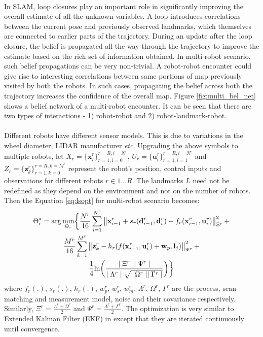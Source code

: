 \paragraph{}
In SLAM, loop closures play an important role in significantly improving the overall estimate of all the unknown variables. A loop introduces correlations between the current pose and previously observed landmarks, which themselves are connected to earlier parts of the trajectory. During an update after the loop closure, the belief is propagated all the way through the trajectory to improve the estimate based on the rich set of information obtained. In multi-robot scenario, such belief propagations can be very non-trivial. A robot-robot encounter could give rise to interesting correlations between same portions of map previously visited by both the robots. In such cases, propagating the belief across both the trajectory increases the confidence of the overall map. Figure \ref{fig:multi_bel_net} shows a belief network of a multi-robot encounter. It can be seen that there are two types of interactions - 1) robot-robot and 2) robot-landmark-robot. 
\paragraph{}
Different robots have different sensor models. This is due to variations in the wheel diameter, LIDAR manufacturer \textit{etc}. Upgrading the above symbols to multiple robots, let $X_r = \{\textbf{x}_i^r\}_{r=1,i=0}^{r=R,i=N^r}$, $U_r = \{\textbf{u}_i^r\}_{r=1,i=1}^{r=R,i=N^r}$ and $Z_r = \{\textbf{z}_k^r\}_{r=1,k=0}^{r=R,k=M^r}$ represent the robot's position, control inputs and observations for different robots $r\in 1...R$. The landmarks $L$ need not be redefined as they depend on the environment and not on the number of robots. Then the Equation \ref{eq:lsopt} for multi-robot scenario becomes: 
\begin{multline}
\Theta^*_r = \text{arg} \min_{\Theta_r} \biggl\{ \frac{N^r}{16} \sum_{i=1}^{N^r} \left\lVert\textbf{x}_{i-1}^r + s_r(\textbf{d}_{i-1}^r, \textbf{d}_i^r) - f_r(\textbf{x}_{i-1}^r,\textbf{u}_i^r)\right\rVert_{\Xi^r}^2 + \\ \frac{M^r}{16} \sum_{k=1}^{M^r} \left\lVert\textbf{z}_{k}^r - h_r(f(\textbf{x}_{i-1}^r, \textbf{u}_i^r) + \textbf{w}_p, \textbf{l}_j)\right\rVert_{\Psi^r}^2 + \\ \frac{1}{4} \text{ln} \biggl( \frac{\mid \Xi^r \mid \mid \Psi^r \mid}{\mid \Lambda^r \mid \sqrt{\mid \Omega^r \mid \mid \Gamma^r \mid}} \biggr) \biggr\}
\label{eq:multilsopt}
\end{multline}
where $f_r(.)$, $s_r(.)$, $h_r(.)$, $w_p^r$, $w_s^r$, $w_m^r$, $\Lambda^r$, $\Omega^r$, $\Gamma^r$ are the process, scan-matching and measurement model, noise and their covariance respectively. Similarly, $\Xi^r = \frac{\Lambda^r+\Omega^r}{2}$ and $\Psi^r = \frac{\Lambda^r+\Gamma^r}{2}$. The optimization is very similar to Extended Kalman Filter (EKF) in \cite{smithekf} except that they are iterated continuously until convergence. 


